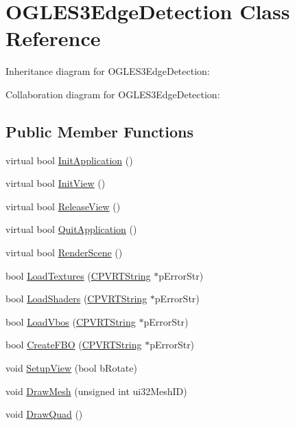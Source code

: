 \hypertarget{class_o_g_l_e_s3_edge_detection}{\section{O\+G\+L\+E\+S3\+Edge\+Detection Class Reference}
\label{class_o_g_l_e_s3_edge_detection}
}


Inheritance diagram for O\+G\+L\+E\+S3\+Edge\+Detection\+:


Collaboration diagram for O\+G\+L\+E\+S3\+Edge\+Detection\+:
\subsection*{Public Member Functions}
\begin{DoxyCompactItemize}
\item 
virtual bool \hyperlink{class_o_g_l_e_s3_edge_detection_a718d02ddfbd3b431385d27d7781005a3}{Init\+Application} ()
\item 
virtual bool \hyperlink{class_o_g_l_e_s3_edge_detection_aceba315d85b9e702425aec86f7d6d1ba}{Init\+View} ()
\item 
virtual bool \hyperlink{class_o_g_l_e_s3_edge_detection_aef87f9cc90245ab048c1ec4797d19eff}{Release\+View} ()
\item 
virtual bool \hyperlink{class_o_g_l_e_s3_edge_detection_a481104177a7253d45ae38dde767dee5c}{Quit\+Application} ()
\item 
virtual bool \hyperlink{class_o_g_l_e_s3_edge_detection_aa0e6da68d3873ff11492fcc2db090230}{Render\+Scene} ()
\item 
bool \hyperlink{class_o_g_l_e_s3_edge_detection_a385c9655de6ad857aad289ea02863949}{Load\+Textures} (\hyperlink{class_c_p_v_r_t_string}{C\+P\+V\+R\+T\+String} $\ast$p\+Error\+Str)
\item 
bool \hyperlink{class_o_g_l_e_s3_edge_detection_aa35c89d1640749ddc3df9ae8885cd0e8}{Load\+Shaders} (\hyperlink{class_c_p_v_r_t_string}{C\+P\+V\+R\+T\+String} $\ast$p\+Error\+Str)
\item 
bool \hyperlink{class_o_g_l_e_s3_edge_detection_a6ffb6feb13d9ff1134356dbf0258c279}{Load\+Vbos} (\hyperlink{class_c_p_v_r_t_string}{C\+P\+V\+R\+T\+String} $\ast$p\+Error\+Str)
\item 
bool \hyperlink{class_o_g_l_e_s3_edge_detection_a30ee2380b777d724cda6cd5ac55c349f}{Create\+F\+B\+O} (\hyperlink{class_c_p_v_r_t_string}{C\+P\+V\+R\+T\+String} $\ast$p\+Error\+Str)
\item 
void \hyperlink{class_o_g_l_e_s3_edge_detection_a25890cacb4e3b9cd75193851fefda205}{Setup\+View} (bool b\+Rotate)
\item 
void \hyperlink{class_o_g_l_e_s3_edge_detection_a4b19c6071e6c196b8558fee00696f485}{Draw\+Mesh} (unsigned int ui32\+Mesh\+I\+D)
\item 
void \hyperlink{class_o_g_l_e_s3_edge_detection_ae9ea73dd6c0faf74b82d6934edd1f7f4}{Draw\+Quad} ()
\end{DoxyCompactItemize}


